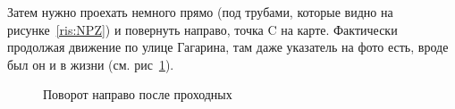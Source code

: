 \documentclass[a4paper, 12pt]{extarticle}
\begin{document}
\par Затем нужно проехать немного прямо (под трубами, которые видно на рисунке~\ref{ris:NPZ}) и повернуть направо, точка C на карте. Фактически продолжая движение по улице Гагарина, там даже указатель на фото есть, вроде был он и в жизни (см. рис~\ref{ris:afterNPZ}).
\begin{figure}[h!]
	\caption{Поворот направо после проходных}
	\label{ris:afterNPZ}
\end{figure}
\end{document}
